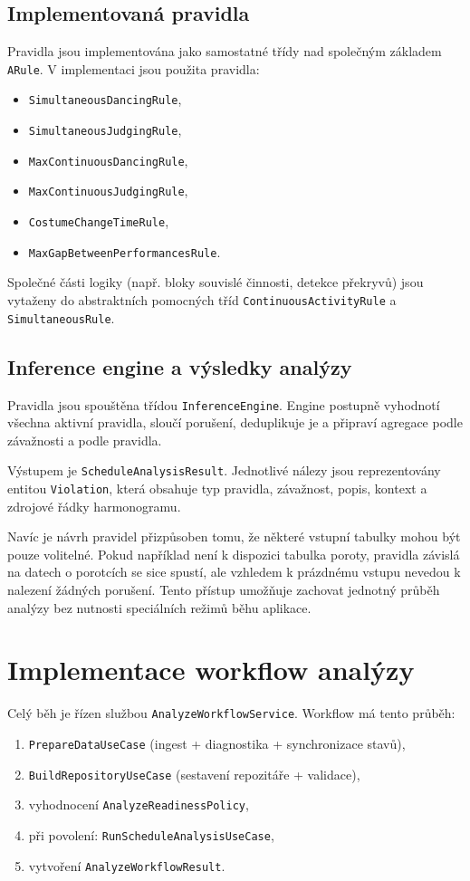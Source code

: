 \documentclass[czech, kiv, ba, he, iso690alph, pdf]{fasthesis}
\begin{document}
			\subsection{Implementovaná pravidla}
				Pravidla jsou implementována jako samostatné třídy nad společným základem \texttt{ARule}. V implementaci jsou použita pravidla:
				\begin{itemize}
					\item \texttt{SimultaneousDancingRule},
					\item \texttt{SimultaneousJudgingRule},
					\item \texttt{MaxContinuousDancingRule},
					\item \texttt{MaxContinuousJudgingRule},
					\item \texttt{CostumeChangeTimeRule},
					\item \texttt{MaxGapBetweenPerformancesRule}.
				\end{itemize}
	
				Společné části logiky (např. bloky souvislé činnosti, detekce překryvů) jsou vytaženy do abstraktních pomocných tříd \texttt{ContinuousActivityRule} a \texttt{SimultaneousRule}.
	
			\subsection{Inference engine a výsledky analýzy}
				Pravidla jsou spouštěna třídou \texttt{InferenceEngine}. Engine postupně vyhodnotí všechna aktivní pravidla, sloučí porušení, deduplikuje je a připraví agregace podle závažnosti a podle pravidla.
	
				Výstupem je \texttt{ScheduleAnalysisResult}. Jednotlivé nálezy jsou reprezentovány entitou \texttt{Violation}, která obsahuje typ pravidla, závažnost, popis, kontext a zdrojové řádky harmonogramu.
				
				Navíc je návrh pravidel přizpůsoben tomu, že některé vstupní tabulky mohou být pouze volitelné. Pokud například není k dispozici tabulka poroty, pravidla závislá na datech o porotcích se sice spustí, ale vzhledem k prázdnému vstupu nevedou k nalezení žádných porušení. Tento přístup umožňuje zachovat jednotný průběh analýzy bez nutnosti speciálních režimů běhu aplikace.
	
		\section{Implementace workflow analýzy}
			Celý běh je řízen službou \texttt{AnalyzeWorkflowService}. Workflow má tento průběh:
			\begin{enumerate}
				\item \texttt{PrepareDataUseCase} (ingest + diagnostika + synchronizace stavů),
				\item \texttt{BuildRepositoryUseCase} (sestavení repozitáře + validace),
				\item vyhodnocení \texttt{AnalyzeReadinessPolicy},
				\item při povolení: \texttt{RunScheduleAnalysisUseCase},
				\item vytvoření \texttt{AnalyzeWorkflowResult}.
			\end{enumerate}
	
\end{document}
